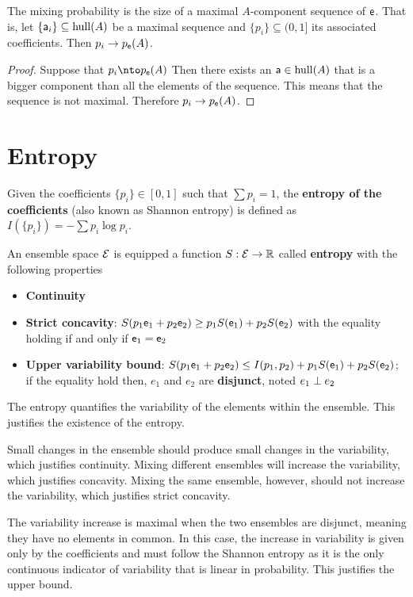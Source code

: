 \begin{coro}
	The mixing probability is the size of a maximal $A$-component sequence of $\ens$. That is, let $\{\ens[a]_i\} \subseteq \hull(A)$ be a maximal sequence and $\{p_i\} \subseteq (0,1]$ its associated coefficients. Then $p_i \to p_{\ens}(A)$. 
\end{coro}

\begin{proof}
	Suppose that $p_i \nto p_{\ens}(A)$ Then there exists an $\ens[a] \in \hull(A)$ that is a bigger component than all the elements of the sequence. This means that the sequence is not maximal. Therefore $p_i \to p_{\ens}(A)$.
\end{proof}

\section{Entropy}

\begin{defn}
	Given the coefficients $\{p_i\} \in [0,1]$ such that $\sum p_i = 1$, the \textbf{entropy of the coefficients} (also known as Shannon entropy) is defined as $I(\{p_i\}) = - \sum p_i \log p_i $.
\end{defn}

\begin{axiom}
	An ensemble space $\Ens$ is equipped a function $S : \Ens \to \mathbb{R}$ called \textbf{entropy} with the following properties
	\begin{itemize}
		\item \textbf{Continuity}
		\item \textbf{Strict concavity}: $S(p_1\ens_1 + p_2 \ens_2) \geq p_1 S(\ens_1) + p_2 S(\ens_2)$ with the equality holding if and only if $\ens_1 = \ens_2$
		\item \textbf{Upper variability bound}: $S(p_1\ens_1 + p_2 \ens_2) \leq I(p_1, p_2) + p_1 S(\ens_1) + p_2 S(\ens_2)$; if the equality hold then, $e_1$ and $e_2$ are \textbf{disjunct}, noted $e_1 \disjunct e_2$
	\end{itemize}
\end{axiom}

\begin{justification}
	The entropy quantifies the variability of the elements within the ensemble. This justifies the existence of the entropy.
	
	Small changes in the ensemble should produce small changes in the variability, which justifies continuity. Mixing different ensembles will increase the variability, which justifies concavity. Mixing the same ensemble, however, should not increase the variability, which justifies strict concavity. 
	
	The variability increase is maximal when the two ensembles are disjunct, meaning they have no elements in common. In this case, the increase in variability is given only by the coefficients and must follow the Shannon entropy as it is the only continuous indicator of variability that is linear in probability. This justifies the upper bound.
\end{justification}

